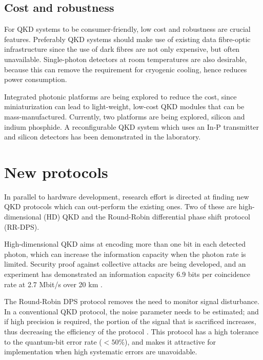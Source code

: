 \subsection{Cost and robustness}
For QKD systems to be consumer-friendly, low cost and robustness are crucial features. Preferably QKD systems should make use of existing data fibre-optic infrastructure since the use of dark fibres are not only expensive, but often unavailable\cite{diamanti2016practical}. Single-photon detectors at room temperatures are also desirable, 
because this can remove the requirement for cryogenic cooling, hence reduces power consumption.

Integrated photonic platforms are being explored to reduce the cost, since miniaturization can lead to light-weight, low-cost QKD modules that can be mass-manufactured. 
Currently, two platforms are being explored, silicon\cite{lim2014review} and indium phosphide\cite{smit2014introduction}.
A reconfigurable QKD system which uses an In-P transmitter and silicon detectors has been demonstrated in the laboratory\cite{sibson2017chip}.




\section{New protocols}
In parallel to hardware development, research effort is directed at finding new QKD protocols which can out-perform the existing ones. Two of these are high-dimensional (HD) QKD and the Round-Robin differential phase shift protocol (RR-DPS).

High-dimensional QKD aims at encoding more than one bit in each detected photon, which can increase the information capacity when the photon rate is limited.
Security proof against collective attacks are being developed, and an experiment has demonstrated an information capacity
 6.9 bits per coincidence rate at 2.7 Mbit/s over 20 km \cite{zhong2015photon}.

The Round-Robin DPS protocol\cite{sasaki2014practical} removes the need to monitor signal disturbance. In a conventional QKD protocol, the noise parameter needs to
be estimated; and if high precision is required, the portion of the signal that is sacrificed increases, thus decreasing the efficiency of the protocol \cite{cai2009finite,hayashi2014security}. This protocol has a high tolerance to
the quantum-bit error rate ($< 50\%$)\cite{xu2015discrete}, and makes it attractive for implementation when high systematic errors are unavoidable.   

